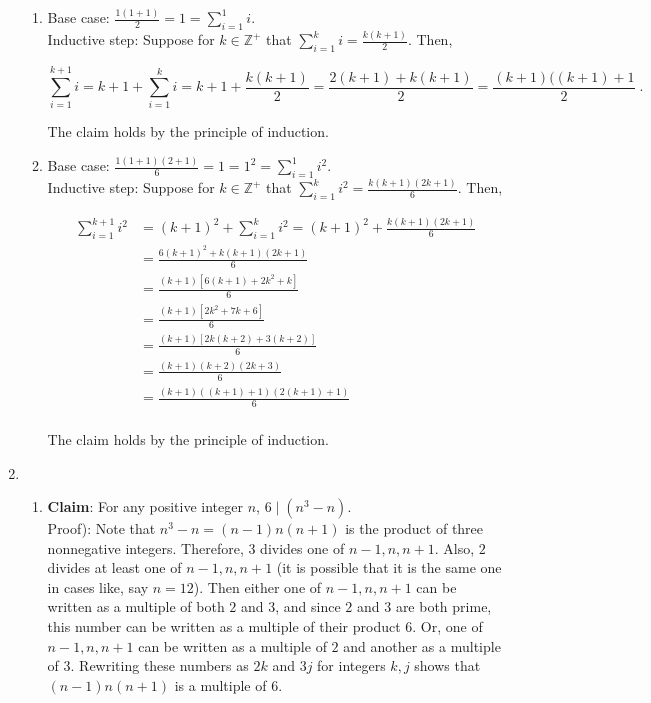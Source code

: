 \documentclass[a4paper]{article}
\begin{document}
\begin{enumerate}
\begin{enumerate}
	\item
	
	Base case: $\frac{1(1+1)}{2} = 1 = \sum_{i=1}^1 i$.\\
	Inductive step: Suppose for $k \in \mathbb{Z}^+$ that $			\sum_{i = 1}^k i = \frac{k(k+1)}{2}$. Then,
	
	$$
	\sum_{i=1}^{k+1} i
	= k+1 + \sum_{i=1}^k i
	= k+1 + \frac{k(k+1)}{2}
	= \frac{2(k+1) + k(k+1)}{2}
	= \frac{(k+1)((k+1)+1}{2} \;.
	$$
	
	The claim holds by the principle of induction.
	
	\item
	
	Base case: $\frac{1(1+1)(2+1)}{6}=1=1^2=\sum_{i=1}^1i^2$.\\
	Inductive step: Suppose for $k \in \mathbb{Z}^+$ that $			\sum_{i = 1}^k i^2 = \frac{k(k+1)(2k+1)}{6}$. Then,
	
	\begin{align*}
	\sum_{i=1}^{k+1} i^2 &= (k+1)^2 + \sum_{i=1}^k i^2
	= (k+1)^2 + \frac{k(k+1)(2k+1)}{6} \\
	&= \frac{6(k+1)^2 + k(k+1)(2k+1)}{6} \\
	&= \frac{(k+1)[6(k+1) + 2k^2 + k]}{6} \\
	&= \frac{(k+1)[2k^2 + 7k + 6]}{6} \\
	&= \frac{(k+1)[2k(k + 2) + 3(k + 2)]}{6} \\
	&= \frac{(k+1)(k+2)(2k + 3)}{6} \\
	&= \frac{(k+1)((k+1)+1)(2(k+1) + 1)}{6}\ \\
	\end{align*}
	
	The claim holds by the principle of induction.

\end{enumerate}

	
\item

\begin{enumerate}

	\item
	
	{\bf Claim}: For any positive integer $n$,
	$6 \mid (n^3 - n)$. \\
	Proof): Note that $n^3-n = (n-1)n(n+1)$ is the product of three 
	nonnegative integers. Therefore, $3$ divides one of
	$n-1, n, n+1$. Also, $2$ divides at least one of $n-1, n, n+1$
	(it is possible that it is the same one in cases like, say $n=12$).
	Then either one of $n-1, n, n+1$ can be written as a multiple of 
	both $2$ and $3$, and since $2$ and $3$ are both prime, this number
	can be written as a multiple of their product $6$. Or, one of 
	$n-1, n, n+1$ can be written as a multiple of $2$ and another as a 
	multiple of $3$. Rewriting these numbers as $2k$ and $3j$ for 
	integers $k,j$ shows that $(n-1)n(n+1)$ is a multiple of $6$. \\
	

\end{enumerate}
\end{enumerate}
\end{document}
